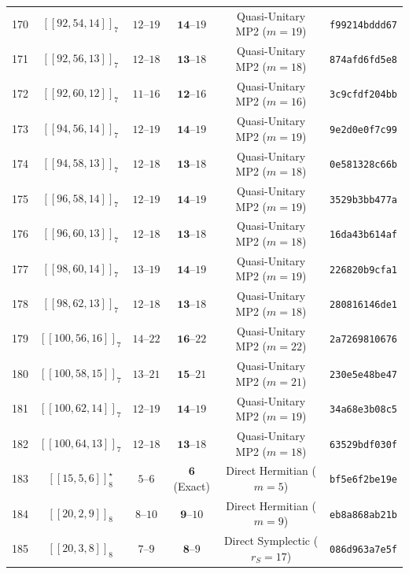 \documentclass[11pt,a4paper]{article}
\theoremstyle{remark}
\begin{document}
{\begin{longtable}{@{}rccccl@{}}
170 & $[[92,54,14]]_{7}$ & $12\text{--}19$ & $\mathbf{14}\text{--}19$ & Quasi-Unitary MP2 ($m=19$) & \texttt{f99214bddd67} \\
171 & $[[92,56,13]]_{7}$ & $12\text{--}18$ & $\mathbf{13}\text{--}18$ & Quasi-Unitary MP2 ($m=18$) & \texttt{874afd6fd5e8} \\
172 & $[[92,60,12]]_{7}$ & $11\text{--}16$ & $\mathbf{12}\text{--}16$ & Quasi-Unitary MP2 ($m=16$) & \texttt{3c9cfdf204bb} \\
173 & $[[94,56,14]]_{7}$ & $12\text{--}19$ & $\mathbf{14}\text{--}19$ & Quasi-Unitary MP2 ($m=19$) & \texttt{9e2d0e0f7c99} \\
174 & $[[94,58,13]]_{7}$ & $12\text{--}18$ & $\mathbf{13}\text{--}18$ & Quasi-Unitary MP2 ($m=18$) & \texttt{0e581328c66b} \\
175 & $[[96,58,14]]_{7}$ & $12\text{--}19$ & $\mathbf{14}\text{--}19$ & Quasi-Unitary MP2 ($m=19$) & \texttt{3529b3bb477a} \\
176 & $[[96,60,13]]_{7}$ & $12\text{--}18$ & $\mathbf{13}\text{--}18$ & Quasi-Unitary MP2 ($m=18$) & \texttt{16da43b614af} \\
177 & $[[98,60,14]]_{7}$ & $13\text{--}19$ & $\mathbf{14}\text{--}19$ & Quasi-Unitary MP2 ($m=19$) & \texttt{226820b9cfa1} \\
178 & $[[98,62,13]]_{7}$ & $12\text{--}18$ & $\mathbf{13}\text{--}18$ & Quasi-Unitary MP2 ($m=18$) & \texttt{280816146de1} \\
179 & $[[100,56,16]]_{7}$ & $14\text{--}22$ & $\mathbf{16}\text{--}22$ & Quasi-Unitary MP2 ($m=22$) & \texttt{2a7269810676} \\
180 & $[[100,58,15]]_{7}$ & $13\text{--}21$ & $\mathbf{15}\text{--}21$ & Quasi-Unitary MP2 ($m=21$) & \texttt{230e5e48be47} \\
181 & $[[100,62,14]]_{7}$ & $12\text{--}19$ & $\mathbf{14}\text{--}19$ & Quasi-Unitary MP2 ($m=19$) & \texttt{34a68e3b08c5} \\
182 & $[[100,64,13]]_{7}$ & $12\text{--}18$ & $\mathbf{13}\text{--}18$ & Quasi-Unitary MP2 ($m=18$) & \texttt{63529bdf030f} \\
\midrule
183 & $[[15,5,6]]_{8}^\star$ & $5\text{--}6$ & $\mathbf{6}$ (Exact) & Direct Hermitian ($m=5$) & \texttt{bf5e6f2be19e} \\
184 & $[[20,2,9]]_{8}$ & $8\text{--}10$ & $\mathbf{9}\text{--}10$ & Direct Hermitian ($m=9$) & \texttt{eb8a868ab21b} \\
185 & $[[20,3,8]]_{8}$ & $7\text{--}9$ & $\mathbf{8}\text{--}9$ & Direct Symplectic ($r_S=17$) & \texttt{086d963a7e5f} \\

\end{longtable}}
\end{document}
